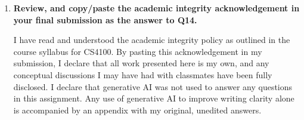 \documentclass[a4paper]{article}
\begin{document}
\begin{sloppypar}
\begin{enumerate}[start=14,label=Q\arabic*,left=0pt]
    \item \textbf{Review, and copy/paste the academic integrity acknowledgement in your final submission as the answer to Q14.}
    
    \par I have read and understood the academic integrity policy as outlined in the course syllabus for CS4100. 
    By pasting this acknowledgement in my submission, I declare that all work presented here is my own, 
    and any conceptual discussions I may have had with classmates have been fully disclosed. I declare that generative AI 
    was not used to answer any questions in this assignment. Any use of generative AI to improve writing clarity 
    alone is accompanied by an appendix with my original, unedited answers.

\end{enumerate}
\end{sloppypar}



\end{document}
